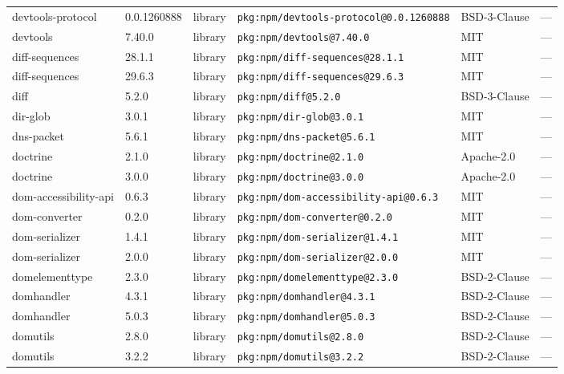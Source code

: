 \documentclass[11pt,a4paper]{article}
\begin{document}
\begin{longtable}{|p{4cm}|p{2cm}|p{1.6cm}|p{5cm}|p{1.5cm}|p{3.5cm}|}
\raggedright devtools-protocol & 0.0.1260888 & library & \small\texttt{pkg:npm/devtools-protocol@0.0.1260888} & BSD-3-Clause & \small — \\
\raggedright devtools & 7.40.0 & library & \small\texttt{pkg:npm/devtools@7.40.0} & MIT & \small — \\
\raggedright diff-sequences & 28.1.1 & library & \small\texttt{pkg:npm/diff-sequences@28.1.1} & MIT & \small — \\
\raggedright diff-sequences & 29.6.3 & library & \small\texttt{pkg:npm/diff-sequences@29.6.3} & MIT & \small — \\
\raggedright diff & 5.2.0 & library & \small\texttt{pkg:npm/diff@5.2.0} & BSD-3-Clause & \small — \\
\raggedright dir-glob & 3.0.1 & library & \small\texttt{pkg:npm/dir-glob@3.0.1} & MIT & \small — \\
\raggedright dns-packet & 5.6.1 & library & \small\texttt{pkg:npm/dns-packet@5.6.1} & MIT & \small — \\
\raggedright doctrine & 2.1.0 & library & \small\texttt{pkg:npm/doctrine@2.1.0} & Apache-2.0 & \small — \\
\raggedright doctrine & 3.0.0 & library & \small\texttt{pkg:npm/doctrine@3.0.0} & Apache-2.0 & \small — \\
\raggedright dom-accessibility-api & 0.6.3 & library & \small\texttt{pkg:npm/dom-accessibility-api@0.6.3} & MIT & \small — \\
\raggedright dom-converter & 0.2.0 & library & \small\texttt{pkg:npm/dom-converter@0.2.0} & MIT & \small — \\
\raggedright dom-serializer & 1.4.1 & library & \small\texttt{pkg:npm/dom-serializer@1.4.1} & MIT & \small — \\
\raggedright dom-serializer & 2.0.0 & library & \small\texttt{pkg:npm/dom-serializer@2.0.0} & MIT & \small — \\
\raggedright domelementtype & 2.3.0 & library & \small\texttt{pkg:npm/domelementtype@2.3.0} & BSD-2-Clause & \small — \\
\raggedright domhandler & 4.3.1 & library & \small\texttt{pkg:npm/domhandler@4.3.1} & BSD-2-Clause & \small — \\
\raggedright domhandler & 5.0.3 & library & \small\texttt{pkg:npm/domhandler@5.0.3} & BSD-2-Clause & \small — \\
\raggedright domutils & 2.8.0 & library & \small\texttt{pkg:npm/domutils@2.8.0} & BSD-2-Clause & \small — \\
\raggedright domutils & 3.2.2 & library & \small\texttt{pkg:npm/domutils@3.2.2} & BSD-2-Clause & \small — \\

\end{longtable}
\end{document}
